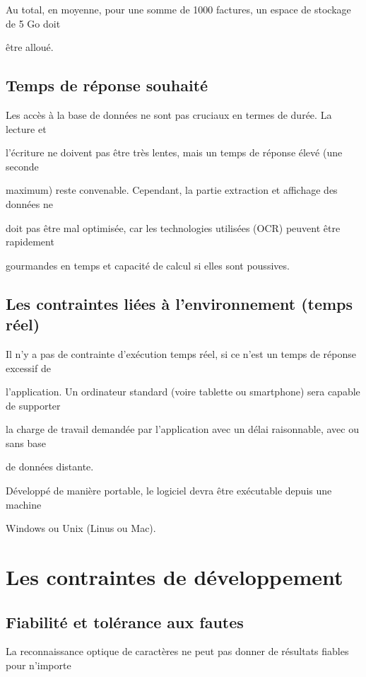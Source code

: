 \documentclass[a4paper,10pt]{article}
\begin{document}
Au total, en moyenne, pour une somme de 1000 factures, un espace de stockage de 5 Go doit 

être alloué.

\subsection{Temps de réponse souhaité}

Les accès à la base de données ne sont pas cruciaux en termes de durée. La lecture et 

l’écriture ne doivent pas être très lentes, mais un temps de réponse élevé (une seconde 

maximum) reste convenable. Cependant, la partie extraction et affichage des données ne 

doit pas être mal optimisée, car les technologies utilisées (OCR) peuvent être rapidement 

gourmandes en temps et capacité de calcul si elles sont poussives.

\subsection{Les contraintes liées à l'environnement (temps réel)}

Il n’y a pas de contrainte d’exécution temps réel, si ce n’est un temps de réponse excessif de 

l’application. Un ordinateur standard (voire tablette ou smartphone) sera capable de supporter 

la charge de travail demandée par l’application avec un délai raisonnable, avec ou sans base 

de données distante.

Développé de manière portable, le logiciel devra être exécutable depuis une machine 

Windows ou Unix (Linus ou Mac).

\section{ Les contraintes de développement}

\subsection{Fiabilité et tolérance aux fautes}

La reconnaissance optique de caractères ne peut pas donner de résultats fiables pour n’importe 
\end{document}
